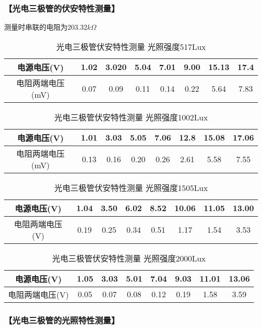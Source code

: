\documentclass{ctexart}
\let\oldsubsubsection\subsubsection
\renewcommand{\subsubsection}[1]{\oldsubsubsection{\!\!\!\!\!\!【#1】}}
\begin{document}
\subsubsection{光电三极管的伏安特性测量}

测量时串联的电阻为$203.32k\Omega$

\begin{table*}[!htbp]
  \centering
  \begin{tabular}{|c|c|c|c|c|c|c|c|}
    \hline
    电源电压(V) &1.02&3.020&5.04&7.01&9.00&15.13&17.4\\\hline
    电阻两端电压(mV) &0.07&0.09&0.11&0.14&0.22&5.64&7.83\\\hline
  \end{tabular}
  \caption{光电三极管伏安特性测量 光照强度517Lux}
\end{table*}

\begin{table*}[!htbp]
  \centering
  \begin{tabular}{|c|c|c|c|c|c|c|c|}
    \hline
    电源电压(V) &1.01&3.03&5.05&7.06&12.8&15.08&17.06\\\hline
    电阻两端电压(mV) &0.13&0.16&0.20&0.26&2.61&5.58&7.55\\\hline
  \end{tabular}
  \caption{光电三极管伏安特性测量 光照强度1002Lux}
\end{table*}

\begin{table*}[!htbp]
  \centering
  \begin{tabular}{|c|c|c|c|c|c|c|c|}
    \hline
    电源电压(V) &1.04&3.50&6.02&8.52&10.06&11.05&13.00\\\hline
    电阻两端电压(V) &0.19&0.25&0.34&0.51&1.17&1.54&3.53\\\hline
  \end{tabular}
  \caption{光电三极管伏安特性测量 光照强度1505Lux}
\end{table*}

\begin{table*}[!htbp]
  \centering
  \begin{tabular}{|c|c|c|c|c|c|c|c|}
    \hline
    电源电压(V) &1.05&3.03&5.01&7.04&9.03&11.01&13.06\\\hline
    电阻两端电压(V) &0.05&0.07&0.08&0.12&0.19&1.58&3.59\\\hline
  \end{tabular}
  \caption{光电三极管伏安特性测量 光照强度2000Lux}
\end{table*}

\subsubsection{光电三极管的光照特性测量}
\end{document}

